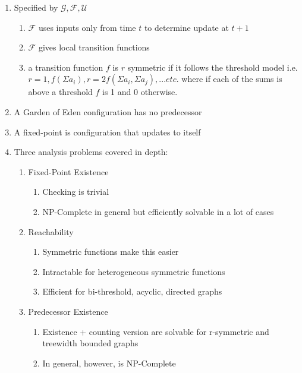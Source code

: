 \documentclass[11pt]{article}
\begin{document}
\begin{enumerate}
    \item Specified by $\mathcal{G, F, U}$
    \begin{enumerate}
        \item $\mathcal{F}$ uses inputs only from time $t$ to determine update at $t+1$
        \item $\mathcal{F}$ gives local transition functions
        \item a transition function $f$ is $r$ symmetric if it follows the threshold model i.e. $r=1,f(\Sigma a_{i}), r=2 f(\Sigma a_{i}, \Sigma a_{j}), ... etc.$ where if each of the sums is above a threshold $f$ is 1 and 0 otherwise.
    \end{enumerate}
    \item A Garden of Eden configuration has no predecessor
    \item A fixed-point is configuration that updates to itself
    
    \item Three analysis problems covered in depth:
    \begin{enumerate}
        \item Fixed-Point Existence
        \begin{enumerate}
            \item Checking is trivial
            \item NP-Complete in general but efficiently solvable in a lot of cases
        \end{enumerate}
        \item Reachability
        \begin{enumerate}
            \item Symmetric functions make this easier
            \item Intractable for heterogeneous symmetric functions
            \item Efficient for bi-threshold, acyclic, directed graphs
        \end{enumerate}
        \item Predecessor Existence
        \begin{enumerate}
            \item Existence + counting version are solvable for r-symmetric and treewidth bounded graphs
            \item In general, however, is NP-Complete
        \end{enumerate}
    \end{enumerate}
\end{enumerate}
\end{document}
